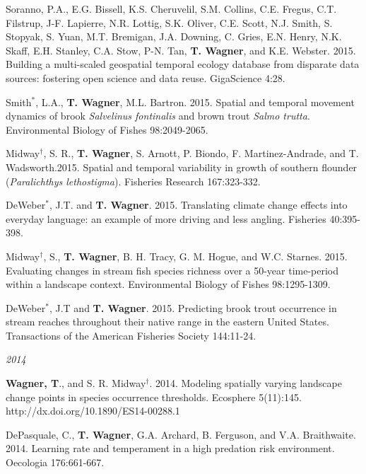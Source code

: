\documentclass[10pt]{article}
\begin{document}
\begin{flushleft}
\begin{etaremune}[start=48]
\item Soranno, P.A., E.G. Bissell, K.S. Cheruvelil, S.M. Collins, C.E. Fregus, C.T. Filstrup, J-F. Lapierre, N.R. Lottig, S.K. Oliver, C.E. Scott, N.J. Smith, S. Stopyak, S. Yuan, M.T. Bremigan, J.A. Downing, C. Gries, E.N. Henry, N.K. Skaff, E.H. Stanley, C.A. Stow, P-N. Tan, {\bf T. Wagner}, and K.E. Webster. 2015. Building a multi-scaled geospatial temporal ecology database from disparate data sources: fostering open science and data reuse. GigaScience 4:28.

\item Smith$^*$, L.A., {\bf T. Wagner}, M.L. Bartron. 2015. Spatial and temporal movement dynamics of brook \emph{Salvelinus fontinalis} and brown trout \emph{Salmo trutta}. Environmental Biology of Fishes 98:2049-2065.

\item Midway$^\dagger$, S. R., {\bf T. Wagner}, S. Arnott, P. Biondo, F. Martinez-Andrade, and T. Wadsworth.2015. Spatial and temporal variability in growth of southern flounder (\emph{Paralichthys lethostigma}). Fisheries Research 167:323-332.

\item DeWeber$^*$, J.T. and {\bf T. Wagner}. 2015. Translating climate change effects into everyday language: an example of more driving and less angling. Fisheries 40:395-398.

\item Midway$^\dagger$, S., {\bf T. Wagner}, B. H. Tracy, G. M. Hogue, and W.C. Starnes. 2015. Evaluating changes in stream fish species richness over a 50-year time-period within a landscape context. Environmental Biology of Fishes 98:1295-1309.

\item DeWeber$^*$, J.T and {\bf T. Wagner}. 2015. Predicting brook trout occurrence in stream reaches throughout their native range in the eastern United States. Transactions of the American Fisheries Society 144:11-24. 

\end{etaremune}
\emph{2014}
\begin{etaremune}[start=41]
\item {\bf Wagner, T}., and S. R. Midway$^\dagger$. 2014. Modeling spatially varying landscape change points in species occurrence thresholds. Ecosphere 5(11):145. http://dx.doi.org/10.1890/ES14-00288.1 

\item DePasquale, C., {\bf T. Wagner}, G.A. Archard, B. Ferguson, and V.A. Braithwaite. 2014. Learning rate and temperament in a high predation risk environment. Oecologia 176:661-667. 


\end{etaremune}
\end{flushleft}
\end{document}
